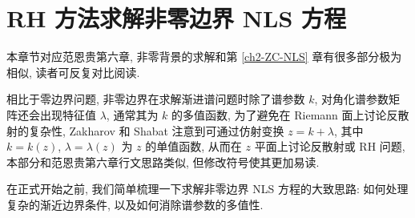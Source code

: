 \chapter{RH 方法求解非零边界 NLS 方程}
本章节对应范恩贵第六章, 非零背景的求解和第 \ref{ch2-ZC-NLS} 章有很多部分极为相似, 读者可反复对比阅读.

相比于零边界问题, 非零边界在求解渐进谱问题时除了谱参数 $k$, 对角化谱参数矩阵还会出现特征值 $\lambda$, 通常其为 $ k $ 的多值函数, 为了避免在 Riemann 面上讨论反散射的复杂性, Zakharov 和 Shabat 注意到可通过仿射变换 $ z = k + \lambda $, 其中 $ k = k(z) $, $ \lambda = \lambda(z) $ 为 $ z $ 的单值函数, 从而在 $ z $ 平面上讨论反散射或 RH 问题, 本部分和范恩贵第六章行文思路类似, 但修改符号使其更加易读.

在正式开始之前, 我们简单梳理一下求解非零边界 NLS 方程的大致思路: 如何处理复杂的渐近边界条件, 以及如何消除谱参数的多值性.

